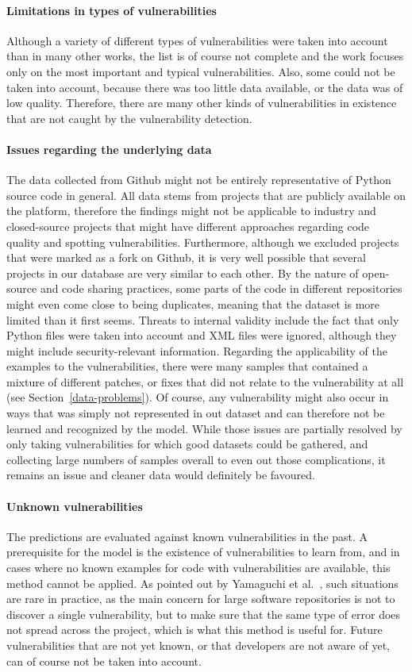 \documentclass[
a4paper,
pagesize,
pdftex,
12pt,
twoside, %
BCOR=5mm, %
ngerman,
fleqn,
final,
]{scrartcl}
\begin{document}
	\paragraph{Limitations in types of vulnerabilities}
	Although a variety of different types of vulnerabilities were taken into account than in many other works, the list is of course not complete and the work focuses only on the most important and typical vulnerabilities. Also, some could not be taken into account, because there was too little data available, or the data was of low quality. Therefore, there are many other kinds of vulnerabilities in existence that are not caught by the vulnerability detection. 
	\paragraph{Issues regarding the underlying data}
	The data collected from Github might not be entirely representative of Python source code in general. All data stems from projects that are publicly available on the platform, therefore the findings might not be applicable to industry and closed-source projects that might have different approaches regarding code quality and spotting vulnerabilities. Furthermore, although we excluded projects that were marked as a fork on Github, it is very well possible that several projects in our database are very similar to each other. By the nature of open-source and code sharing practices, some parts of the code in different repositories might even come close to being duplicates, meaning that the dataset is more limited than it first seems. Threats to internal validity include the fact that only Python files were taken into account and XML files were ignored, although they might include security-relevant information. Regarding the applicability of the examples to the vulnerabilities, there were many samples that contained a mixture of different patches, or fixes that did not relate to the vulnerability at all (see Section~\ref{data-problems}). Of course, any vulnerability might also occur in ways that was simply not represented in out dataset and can therefore not be learned and recognized by the model. While those issues are partially resolved by only taking vulnerabilities for which good datasets could be gathered, and collecting large numbers of samples overall to even out those complications, it remains an issue and cleaner data would definitely be favoured.
	\paragraph{Unknown vulnerabilities}
	The predictions are evaluated against known vulnerabilities in the past. A prerequisite for the model is the existence of vulnerabilities to learn from, and in cases where no known examples for code with vulnerabilities are available, this method cannot be applied. As pointed out by Yamaguchi et al.~\cite{Yamaguchi.2012}, such situations are rare in practice, as the main concern for large software repositories is not to discover a single vulnerability, but to make sure that the same type of error does not spread across the project, which is what this method is useful for. Future vulnerabilities that are not yet known, or that developers are not aware of yet, can of course not be taken into account.
\end{document}
